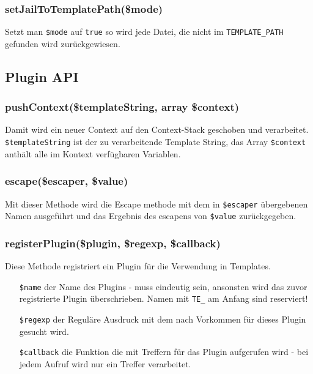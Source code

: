\documentclass[a4paper,10pt]{article}
\begin{document}
\subsubsection{setJailToTemplatePath(\$mode)}
Setzt man {\tt \$mode} auf {\tt true} so wird jede Datei, die nicht im {\tt TEMPLATE\_PATH}
 gefunden wird zur\"uckgewiesen.

\subsection{Plugin API}

\subsubsection{pushContext(\$templateString, array \$context)}
Damit wird ein neuer Context auf den Context-Stack geschoben und verarbeitet.
{\tt \$templateString} ist der zu verarbeitende Template String, das Array {\tt \$context} anth\"alt alle im Kontext verf\"ugbaren Variablen.

\subsubsection{escape(\$escaper, \$value)}
Mit dieser Methode wird die Escape methode mit dem in {\tt \$escaper} \"ubergebenen Namen ausgef\"uhrt und das Ergebnis des escapens von {\tt \$value} zur\"uckgegeben.

\subsubsection{registerPlugin(\$plugin, \$regexp, \$callback)}
Diese Methode registriert ein Plugin f\"ur die Verwendung in Templates.
\begin{itemize}
  \item[\texttt{\$name}] der Name des Plugins - muss eindeutig sein, ansonsten wird das zuvor registrierte Plugin \"uberschrieben. Namen mit {\tt TE\_} am Anfang sind reserviert!
  \item[\texttt{\$regexp}] der Regul\"are Ausdruck mit dem nach Vorkommen f\"ur dieses Plugin gesucht wird.
  \item[\texttt{\$callback}] die Funktion die mit Treffern f\"ur das Plugin aufgerufen wird - bei jedem Aufruf wird nur ein Treffer verarbeitet.
\end{itemize}
\end{document}
